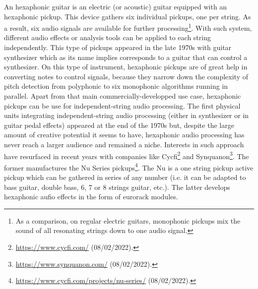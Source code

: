 \documentclass{article}
\begin{document}
An hexaphonic guitar is an electric (or acoustic) guitar equi\-pped with an hexaphonic pickup. This device gathers six individual pickups, one per string. As a result, six audio signals are available for further processing\footnote{As a comparison, on regular electric guitars, monophonic pickups mix the sound of all resonating strings down to one audio signal. }. With such system, different audio effects or analysis tools can be applied to each string independently. This type of pickups appeared in the late 1970s with guitar synthesizer which as its name implies corresponds to a guitar that can control a synthesizer. On this type of instrument, hexaphonic pickups are of great help in converting notes to control signals, because they narrow down the complexity of pitch detection from polyphonic to six monophonic algorithms running in parallel. Apart from that main commercially-developped use case, hexaphonic pickups can be use for independent-string audio processing. The first physical units integrating independent-string audio processing (either in synthesizer or in guitar pedal effects) appeared at the end of the 1970s 
but, despite the large amount of creative potential it seems to have, hexaphonic audio processing has never reach a larger audience and remained a niche.  Interests in such approach have resurfaced in recent years with companies like Cycfi\footnote{\url{https://www.cycfi.com/} (08/02/2022).} and Synquanon\footnote{\url{https://www.synquanon.com/} (08/02/2022).}. The former manufactures the Nu Series pickups\footnote{\url{https://www.cycfi.com/projects/nu-series/} (08/02/2022).}. The Nu is a one string pickup active pickup which can be gathered in series of any number (i.e. it can be adapted to bass guitar, double bass, 6, 7 or 8 strings guitar, etc.). The latter develops hexaphonic aufio effects in the form of eurorack modules. 
\end{document}
